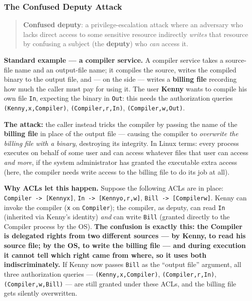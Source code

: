 \documentclass[12pt, a4paper]{article}
\begin{document}
\subsubsection{The Confused Deputy Attack}
\label{subsec:confused-deputy-08}
\begin{quote}
\textcolor{blue!50!black}{\textbf{Confused deputy}}: a privilege-escalation attack where an adversary who lacks direct access to some sensitive resource indirectly \emph{writes} that resource by confusing a subject (the \textbf{deputy}) who \emph{can} access it.
\end{quote}
\textbf{Standard example --- a compiler service.} A compiler service takes a source-file name and an output-file name; it compiles the source, writes the compiled binary to the output file, and --- on the side --- writes a \textbf{billing file} recording how much the caller must pay for using it. The user \textbf{Kenny} wants to compile his own file \texttt{In}, expecting the binary in \texttt{Out}: this needs the authorization queries \texttt{(Kenny,x,Compiler)}, \texttt{(Compiler,r,In)}, \texttt{(Compiler,w,Out)}.

\textcolor{red!70!black}{\textbf{The attack:}} the caller instead tricks the compiler by passing the name of the \textbf{billing file} in place of the output file --- causing the compiler to \emph{overwrite the billing file with a binary}, destroying its integrity. In Linux terms: every process executes on behalf of some user and can access whatever files that user can access \emph{and more}, if the system administrator has granted the executable extra access (here, the compiler needs write access to the billing file to do its job at all).

\textbf{Why ACLs let this happen.} Suppose the following ACLs are in place: \texttt{Compiler -> [Kenny\textbar x]}, \texttt{In -> [Kenny\textbar o,r,w]}, \texttt{Bill -> [Compiler\textbar w]}. Kenny can invoke the compiler (\texttt{x} on \texttt{Compiler}); the compiler, as deputy, can read \texttt{In} (inherited via Kenny's identity) \emph{and} can write \texttt{Bill} (granted directly to the Compiler process by the OS). \textcolor{red!70!black}{\textbf{The confusion is exactly this: the Compiler is delegated rights from two different sources --- by Kenny, to read his source file; by the OS, to write the billing file --- and during execution it cannot tell which right came from where, so it uses both indiscriminately.}} If Kenny now passes \texttt{Bill} as the ``output file'' argument, all three authorization queries --- \texttt{(Kenny,x,Compiler)}, \texttt{(Compiler,r,In)}, \texttt{(Compiler,w,Bill)} --- are still granted under these ACLs, and the billing file gets silently overwritten.
\end{document}
